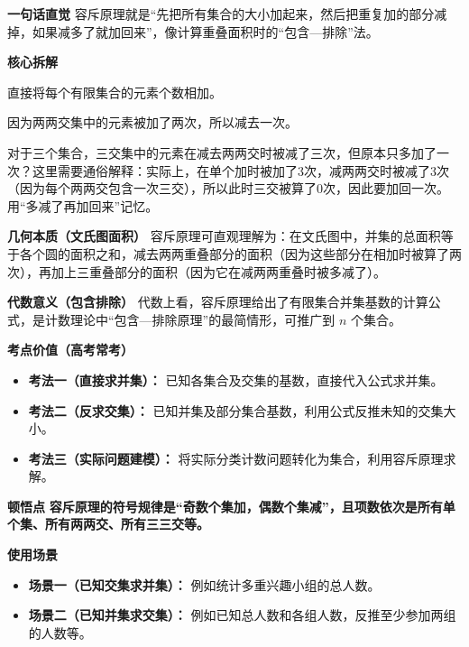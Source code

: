 \begin{explanationbox}
	\textbf{\textcolor{CExplanation}{一句话直觉}}
	容斥原理就是“先把所有集合的大小加起来，然后把重复加的部分减掉，如果减多了就加回来”，像计算重叠面积时的“包含—排除”法。

	\medskip
	\textbf{\textcolor{CExplanation}{核心拆解}}
	\begin{description}[style=nextline, leftmargin=2.8em, labelsep=0.5em, itemsep=0.45em]
		\item[\textbf{要点一（先加全部）：}]
			直接将每个有限集合的元素个数相加。
		\item[\textbf{要点二（减去两两交）：}]
			因为两两交集中的元素被加了两次，所以减去一次。
		\item[\textbf{要点三（加回三交）：}]
			对于三个集合，三交集中的元素在减去两两交时被减了三次，但原本只多加了一次？这里需要通俗解释：实际上，在单个加时被加了3次，减两两交时被减了3次（因为每个两两交包含一次三交），所以此时三交被算了0次，因此要加回一次。用“多减了再加回来”记忆。
	\end{description}

	\medskip
	\textbf{\textcolor{CExplanation}{几何本质（文氏图面积）}}
	容斥原理可直观理解为：在文氏图中，并集的总面积等于各个圆的面积之和，减去两两重叠部分的面积（因为这些部分在相加时被算了两次），再加上三重叠部分的面积（因为它在减两两重叠时被多减了）。

	\medskip
	\textbf{\textcolor{CExplanation}{代数意义（包含排除）}}
	代数上看，容斥原理给出了有限集合并集基数的计算公式，是计数理论中“包含—排除原理”的最简情形，可推广到 $n$ 个集合。

	\medskip
	\textbf{\textcolor{CExplanation}{考点价值（高考常考）}}
	\begin{itemize}[leftmargin=*, itemsep=0.5em, topsep=0.4em]
		\item \textbf{考法一（直接求并集）：} 已知各集合及交集的基数，直接代入公式求并集。
		\item \textbf{考法二（反求交集）：} 已知并集及部分集合基数，利用公式反推未知的交集大小。
		\item \textbf{考法三（实际问题建模）：} 将实际分类计数问题转化为集合，利用容斥原理求解。
	\end{itemize}

	\medskip
	\textbf{\textcolor{CExplanation}{顿悟点}}
	\textbf{容斥原理的符号规律是“奇数个集加，偶数个集减”，且项数依次是所有单个集、所有两两交、所有三三交等。}

	\medskip
	\textbf{\textcolor{CExplanation}{使用场景}}
	\begin{itemize}[leftmargin=*, itemsep=0.5em, topsep=0.4em]
		\item \textbf{场景一（已知交集求并集）：} 例如统计多重兴趣小组的总人数。
		\item \textbf{场景二（已知并集求交集）：} 例如已知总人数和各组人数，反推至少参加两组的人数等。
	\end{itemize}

\end{explanationbox}
